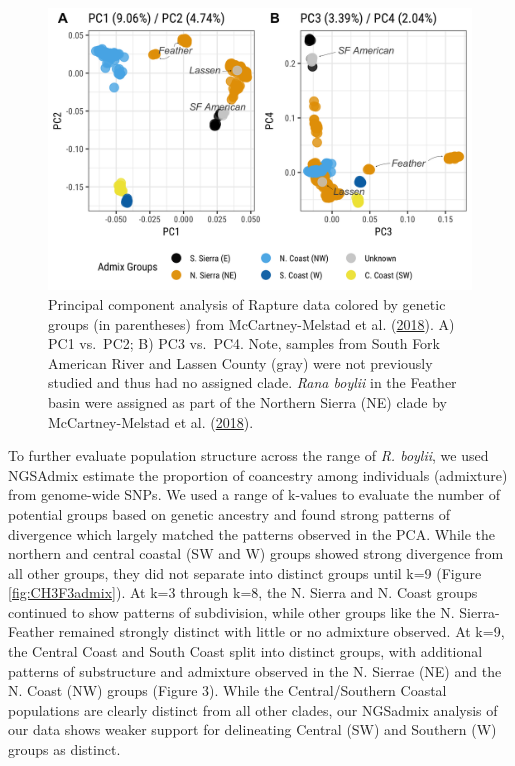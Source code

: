 \documentclass[proquest,12pt,final]{ucthesis-CA2012} %
\begin{document}
\begin{ucmainmatter}
\begin{figure}

{\centering \includegraphics[width=0.95\linewidth]{figure/ch3/fig_02_pca_12_34_all_rabo_filt10_1_100k_thresh_annot} 

}

\caption{Principal component analysis of Rapture data colored by
genetic groups (in parentheses) from McCartney-Melstad et al.
(\protect\hyperlink{ref-mccartney-melstad_population_2018}{2018}). A)
PC1 vs.~PC2; B) PC3 vs.~PC4. Note, samples from South Fork American
River and Lassen County (gray) were not previously studied and thus had
no assigned clade. \emph{Rana boylii} in the Feather basin were assigned
as part of the Northern Sierra (NE) clade by McCartney-Melstad et al.
(\protect\hyperlink{ref-mccartney-melstad_population_2018}{2018}).}\label{fig:CH3F2pca}
\end{figure}
\clearpage

To further evaluate population structure across the range of \emph{R.
boylii}, we used NGSAdmix estimate the proportion of coancestry among
individuals (admixture) from genome-wide SNPs. We used a range of
k-values to evaluate the number of potential groups based on genetic
ancestry and found strong patterns of divergence which largely matched
the patterns observed in the PCA. While the northern and central coastal
(SW and W) groups showed strong divergence from all other groups, they
did not separate into distinct groups until k=9 (Figure
\ref{fig:CH3F3admix}). At k=3 through k=8, the N. Sierra and N. Coast
groups continued to show patterns of subdivision, while other groups
like the N. Sierra-Feather remained strongly distinct with little or no
admixture observed. At k=9, the Central Coast and South Coast split into
distinct groups, with additional patterns of substructure and admixture
observed in the N. Sierrae (NE) and the N. Coast (NW) groups (Figure 3).
While the Central/Southern Coastal populations are clearly distinct from
all other clades, our NGSadmix analysis of our data shows weaker support
for delineating Central (SW) and Southern (W) groups as distinct.






\end{ucmainmatter}
\end{document}
